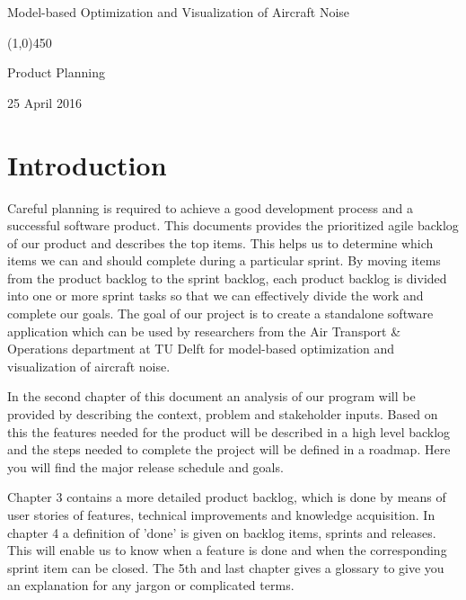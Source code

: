 ﻿\documentclass[a4paper,english,fleqn]{exam}
\newcommand{\cMysename}{Model-based Optimization and Visualization of Aircraft Noise}
\newcommand{\doctitle}{Product Planning }
\newcommand{\deadline}{25 April 2016}
\newcommand{\examdate}{\deadline}
\begin{document}
\thispagestyle{empty}

\begin{center}

\vspace*{2cm}
{\huge \cMysename}

\begin{center}
    \line(1,0){450}
\end{center}

{\LARGE \doctitle}

\vspace{1cm}

{\Large \examdate}

\end{center}
\newpage

\tableofcontents
\newpage

\section{Introduction}

Careful planning is required to achieve a good development process and a successful software product. This documents provides the prioritized agile backlog of our product and describes the top items. This helps us to determine which items we can and should complete during a particular sprint. By moving items from the product backlog to the sprint backlog, each product backlog is divided into one or more sprint tasks so that we can effectively divide the work and complete our goals. The goal of our project is to create a standalone software application which can be used by researchers from the Air Transport \& Operations department at TU Delft for model-based optimization and visualization of aircraft noise.

In the second chapter of this document an analysis of our program will be provided by describing the context, problem and stakeholder inputs. Based on this the features needed for the product will be described in a high level backlog and the steps needed to complete the project will be defined in a roadmap. Here you will find the major release schedule and goals.

Chapter 3 contains a more detailed product backlog, which is done by means of user stories of features, technical improvements and knowledge acquisition. In chapter 4 a definition of 'done' is given on backlog items, sprints and releases. This will enable us to know when a feature is done and when the corresponding sprint item can be closed. The 5th and last chapter gives a glossary to give you an explanation for any jargon or complicated terms.
\end{document}
